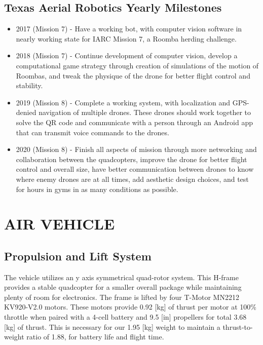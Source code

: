 \documentclass[12pt,letterpaper]{article}
\begin{document}
	\pagebreak
	\subsection*{Texas Aerial Robotics Yearly Milestones}

	\begin{itemize}
		\item 2017 (Mission 7) - Have a working bot, with computer vision software in nearly working state for IARC Mission 7, a Roomba herding challenge.

		\item 2018 (Mission 7) - Continue development of computer vision, develop a computational game strategy through creation of simulations of the motion of Roombas, and tweak the physique of the drone for better flight control and stability.

		\item 2019 (Mission 8) - Complete a working system, with localization and GPS-denied navigation of multiple drones. These drones should work together to solve the QR code and communicate with a person through an Android app that can transmit voice commands to the drones.

		\item 2020 (Mission 8) - Finish all aspects of mission through more networking and collaboration between the quadcopters, improve the drone for better flight control and overall size, have better communication between drones to know where enemy drones are at all times, add aesthetic design choices, and test for hours in gyms in as many conditions as possible.
	\end{itemize}

\section*{AIR VEHICLE}
	\subsection*{Propulsion and Lift System}
	The vehicle utilizes an y axis symmetrical quad-rotor system. This H-frame provides a stable quadcopter for a smaller overall package while maintaining plenty of room for electronics. The frame is lifted by four T-Motor MN2212 KV920-V2.0 motors. These motors provide 0.92 [kg] of thrust per motor at 100\% throttle when paired with a 4-cell battery and 9.5 [in] propellers for total 3.68 [kg] of thrust. This is necessary for our 1.95 [kg] weight to maintain a thrust-to-weight ratio of 1.88, for battery life and flight time.
\end{document}
